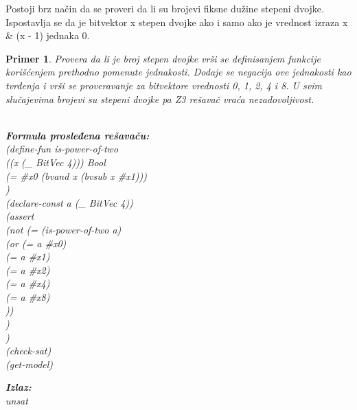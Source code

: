 \documentclass[12pt,oneside]{memoir}
\newcommand\tab[1][0.5cm]{\hspace*{#1}}
\newtheorem{primer}{Primer}
\begin{document}
Postoji brz način da se proveri da li su brojevi fiksne dužine stepeni dvojke. 
Ispostavlja se da je bitvektor x stepen dvojke ako i samo ako je vrednost izraza
x \& (x - 1) jednaka 0.
\begin{primer} Provera da li je broj stepen dvojke vrši se definisanjem funkcije korišćenjem prethodno pomenute jednakosti. Dodaje se negacija ove jednakosti kao tvrđenja i vrši se proveravanje za bitvektore vrednosti 0, 1, 2, 4 i 8. U svim slučajevima brojevi su stepeni dvojke pa Z3 rešavač vraća nezadovoljivost.\\ \\
\begin{minipage}[b]{0.5\textwidth}
\textbf{Formula prosleđena rešavaču:}
\\(define-fun is-power-of-two 
\\\tab((x (\_ BitVec 4))) Bool 
\\\tab(= \#x0 (bvand x (bvsub x \#x1)))
\\)
\\(declare-const a (\_ BitVec 4))
\\(assert 
\\\tab(not (= (is-power-of-two a) 
\\\tab\tab    (or (= a \#x0) 
\\\tab\tab\tab     (= a \#x1) 
\\\tab\tab\tab     (= a \#x2) 
\\\tab\tab\tab     (= a \#x4) 
\\\tab\tab\tab     (= a \#x8)
\\\tab\tab		))
\\\tab )
\\)
\\(check-sat)
\\(get-model)
\end{minipage}
\hspace{2.5cm}
\begin{minipage}[t]{0.5\textwidth}
\vspace{-10.95cm}
\textbf{Izlaz:}
\\unsat
\end{minipage}
\end{primer}
\end{document}
